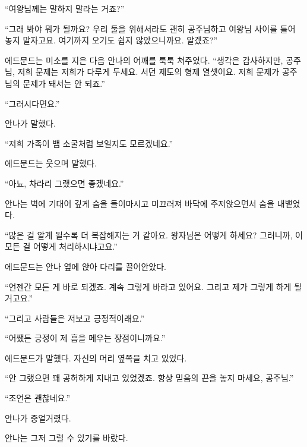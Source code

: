 ``여왕님께는 말하지 말라는 거죠?''

``그래 봐야 뭐가 될까요? 우리 둘을 위해서라도 괜히 공주님하고 여왕님 사이를 틀어 놓지 말자고요. 여기까지 오기도 쉽지 않았으니까요. 알겠죠?''

에드문드는 미소를 지은 다음 안나의 어깨를 툭툭 쳐주었다. ``생각은 감사하지만, 공주님, 저희 문제는 저희가 다루게 두세요. 서던 제도의 형제 열셋이요. 저희 문제가 공주님의 문제가 돼서는 안 되죠.''

``그러시다면요.''

안나가 말했다.

``저희 가족이 뱀 소굴처럼 보일지도 모르겠네요.''

에드문드는 웃으며 말했다.

``아뇨, 차라리 그랬으면 좋겠네요.''

안나는 벽에 기대어 깊게 숨을 들이마시고 미끄러져 바닥에 주저앉으면서 숨을 내뱉었다.

``많은 걸 알게 될수록 더 복잡해지는 거 같아요. 왕자님은 어떻게 하세요? 그러니까, 이 모든 걸 어떻게 처리하시냐고요.''

에드문드는 안나 옆에 앉아 다리를 끌어안았다.

``언젠간 모든 게 바로 되겠죠. 계속 그렇게 바라고 있어요. 그리고 제가 그렇게 하게 될 거고요.''

``그리고 사람들은 저보고 긍정적이래요.''

``어쨌든 긍정이 제 흠을 메우는 장점이니까요.''

에드문드가 말했다. 자신의 머리 옆쪽을 치고 있었다.

``안 그랬으면 꽤 공허하게 지내고 있었겠죠. 항상 믿음의 끈을 놓지 마세요, 공주님.''

``조언은 괜찮네요.''

안나가 중얼거렸다.

안나는 그저 그럴 수 있기를 바랐다.



